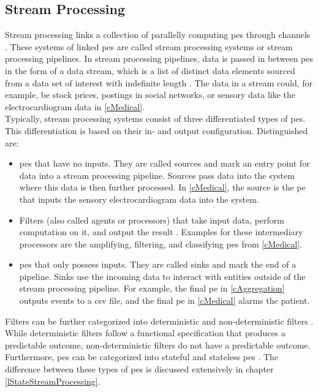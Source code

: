 \subsection{Stream Processing}
\label{lStreamProcessing}
Stream processing links a collection of parallelly computing \gls{pe}s through channels \cite{Stephens.1997}. These systems of linked \gls{pe}s are called stream processing systems \cite{Stephens.1997} or stream processing pipelines. In stream processing pipelines, data is passed in between \gls{pe}s in the form of a data stream, which is a list of distinct data elements sourced from a data set of interest with indefinite length \cite{Stephens.1997}. The data in a stream could, for example, be stock prices, postings in social networks, or sensory data \cite{Hesse.2015} like the electrocardiogram data in \ref{cMedical}.\\
Typically, stream processing systems consist of three differentiated types of \gls{pe}s. This differentiation is based on their in- and output configuration. Distinguished are:
\begin{itemize}
    \item \gls{pe}s that have no inputs. They are called sources \cite{Stephens.1997} and mark an entry point for data into a stream processing pipeline. Sources pass data into the system where this data is then further processed. In \ref{cMedical}, the source is the \gls{pe} that inputs the sensory electrocardiogram data into the system.
    \item Filters (also called agents or processors) that take input data, perform computation on it, and output the result \cite{Stephens.1997}. Examples for these intermediary processors are the amplifying, filtering, and classifying \gls{pe}s from \ref{cMedical}.
    \item \gls{pe}s that only possess inputs. They are called sinks \cite{Stephens.1997} and mark the end of a pipeline. Sinks use the incoming data to interact with entities outside of the stream processing pipeline. For example, the final \gls{pe} in \ref{cAggregation} outputs events to a \gls{csv} file, and the final \gls{pe} in \ref{cMedical} alarms the patient.
\end{itemize}

Filters can be further categorized into deterministic and non-deterministic filters \cite{Stephens.1997}. While deterministic filters follow a functional specification that produces a predictable outcome, non-deterministic filters do not have a predictable outcome.\\
Furthermore, \gls{pe}s can be categorized into stateful and stateless \gls{pe}s \cite{CastroFernandez.2013}. The difference between these types of \gls{pe}s is discussed extensively in chapter \ref{lStateStreamProcessing}.

